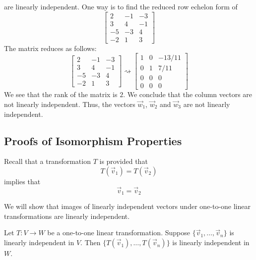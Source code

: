 \documentclass{ximera}
\begin{document}
\begin{example}
\begin{explanation}
are linearly independent.  One way is to find the reduced row echelon form of 
$$\begin{bmatrix}2&-1&-3\\3&4&-1\\-5&-3&4\\-2&1&3\end{bmatrix}$$
The matrix reduces as follows:
$$\begin{bmatrix}2&-1&-3\\3&4&-1\\-5&-3&4\\-2&1&3\end{bmatrix}\rightsquigarrow\begin{bmatrix}1&0&-13/11\\0&1&7/11\\0&0&0\\0&0&0\end{bmatrix}$$
We see that the rank of the matrix is $2$.  We conclude that the column vectors are not linearly independent.   Thus, the vectors $\vec{w}_1$, $\vec{w}_2$ and $\vec{w}_3$ are not linearly independent.
\end{explanation}
\end{example}



\subsection*{Proofs of Isomorphism Properties}

Recall that a transformation $T$ is  provided that $$T(\vec{v}_1)=T(\vec{v}_2)$$ implies that $$\vec{v}_1=\vec{v}_2$$

 We will show that images of linearly independent vectors under one-to-one linear transformations are linearly independent.  

\begin{theorem}\label{th:onetoonelinind} Let $T:V\rightarrow W$ be a one-to-one linear transformation.  Suppose $\{\vec{v}_1,\ldots,\vec{v}_n\}$ is linearly independent in $V$.  Then $\{T(\vec{v}_1),\ldots,T(\vec{v}_n)\}$ is linearly independent in $W$.
\end{theorem}
\end{document}
